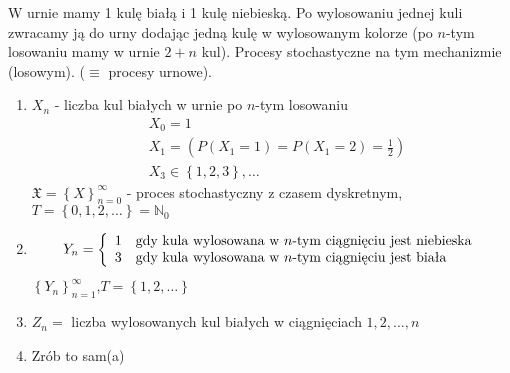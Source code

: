\begin{prz}
W urnie mamy 1 kulę białą i 1 kulę niebieską. Po wylosowaniu jednej kuli zwracamy ją do urny dodając jedną kulę w wylosowanym kolorze (po $ n $-tym losowaniu mamy w urnie $ 2+n $ kul). Procesy stochastyczne na tym mechanizmie (losowym). ($ \equiv $ procesy urnowe).
\begin{enumerate}
\item $ X_n $ - liczba kul białych w urnie po $ n $-tym losowaniu
\begin{align*}
&X_0=1\\
&X_1=\left(P\left(X_1=1\right)=P\left(X_1=2\right)=\frac{1}{2}\right)\\
&X_3\in\left\{1,2,3\right\},\dots
\end{align*}
$ \mathfrak X=\left\{X\right\}_{n=0}^\infty  $ - proces stochastyczny z czasem dyskretnym,\\
$ T=\left\{0,1,2,\dots \right\}=\mathbb N _0 $
\item 
\begin{gather*}
Y_n=\left \{
\begin{array}{ll}
1&\text{gdy kula wylosowana w $ n $-tym ciągnięciu jest niebieska}\\
3&\text{gdy kula wylosowana w $ n $-tym ciągnięciu jest biała}
\end{array}
\right .
\end{gather*}
$ \left\{Y_n\right\}_{n=1}^\infty  $,\qquad $ T=\left\{1,2,\dots\right\} $
\item $ Z_n= $ liczba wylosowanych kul białych w ciągnięciach $ 1,2,\dots,n $
\item Zrób to sam(a)
\end{enumerate}
\end{prz}
